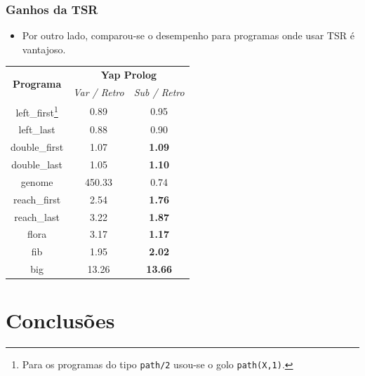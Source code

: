 \documentclass{beamer}
\begin{document}
\begin{frame}
   \frametitle{Ganhos da TSR}
   
   \begin{itemize}
      \item Por outro lado, comparou-se o desempenho para programas onde usar TSR é vantajoso.
   \end{itemize}
   \begin{center}
   {\footnotesize
     \begin{tabular}{ccc}
      \hline
       \hline
       \multirow{2}{*}{\textbf{Programa}} & \multicolumn{2}{c}{\textbf{Yap Prolog}} \\
       & \textit{\small{Var / Retro}} & \textit{\small{Sub / Retro}} \\
      \hline
      \hline
   left\_first\footnote{Para os programas do tipo \texttt{path/2} usou-se o golo \texttt{path(X,1)}.} & 0.89 & 0.95 \\
   left\_last & 0.88  & 0.90 \\
   double\_first & 1.07 & \textbf{1.09} \\
   double\_last & 1.05 & \textbf{1.10} \\
   genome & 450.33 & 0.74 \\
   reach\_first  & 2.54 & \textbf{1.76} \\
   reach\_last  & 3.22 & \textbf{1.87} \\
   flora & 3.17 & \textbf{1.17} \\
   fib & 1.95 & \textbf{2.02} \\
   big & 13.26 & \textbf{13.66} \\
   \hline
   \hline
   \end{tabular}}
   \end{center}
\end{frame}

\section{Conclusões}
\end{document}
